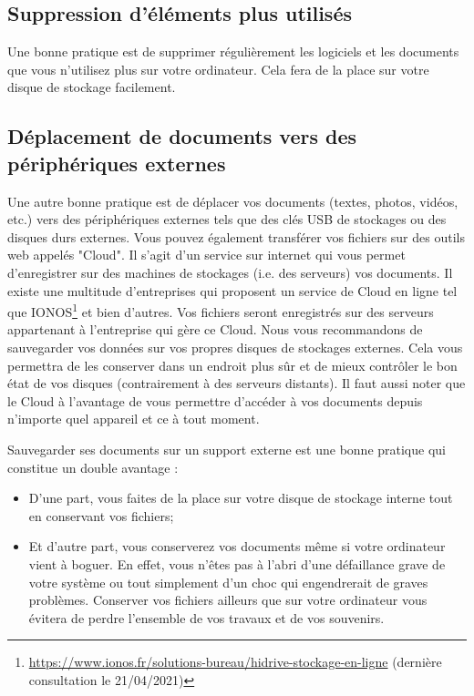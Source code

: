 \documentclass[12pt]{book}
\begin{document}
		\subsection{Suppression d'éléments plus utilisés}
			Une bonne pratique est de supprimer régulièrement les logiciels et les documents que vous n'utilisez plus sur votre ordinateur.
			Cela fera de la place sur votre disque de stockage facilement.
		\subsection{Déplacement de documents vers des périphériques externes}
			Une autre bonne pratique est de déplacer vos documents (textes, photos, vidéos, etc.) vers des périphériques externes tels que des clés USB de stockages ou des disques durs externes.
			Vous pouvez également transférer vos fichiers sur des outils web appelés "Cloud".
			Il s'agit d'un service sur internet qui vous permet d'enregistrer sur des machines de stockages (i.e. des serveurs) vos documents.
			Il existe une multitude d'entreprises qui proposent un service de Cloud en ligne tel que IONOS\footnote{\href{https://www.ionos.fr/solutions-bureau/hidrive-stockage-en-ligne}{https://www.ionos.fr/solutions-bureau/hidrive-stockage-en-ligne} (dernière consultation le 21/04/2021)} et bien d'autres.
			Vos fichiers seront enregistrés sur des serveurs appartenant à l'entreprise qui gère ce Cloud.
			Nous vous recommandons de sauvegarder vos données sur vos propres disques de stockages externes.
			Cela vous permettra de les conserver dans un endroit plus sûr et de mieux contrôler le bon état de vos disques (contrairement à des serveurs distants).
			Il faut aussi noter que le Cloud à l'avantage de vous permettre d'accéder à vos documents depuis n'importe quel appareil et ce à tout moment.\par
			Sauvegarder ses documents sur un support externe est une bonne pratique qui constitue un double avantage :
			\begin{itemize}
				\item D'une part, vous faites de la place sur votre disque de stockage interne tout en conservant vos fichiers;
				\item Et d'autre part, vous conserverez vos documents même si votre ordinateur vient à boguer.
				En effet, vous n'êtes pas à l'abri d'une défaillance grave de votre système ou tout simplement d'un choc qui engendrerait de graves problèmes.
				Conserver vos fichiers ailleurs que sur votre ordinateur vous évitera de perdre l'ensemble de vos travaux et de vos souvenirs.
			\end{itemize}
\end{document}
